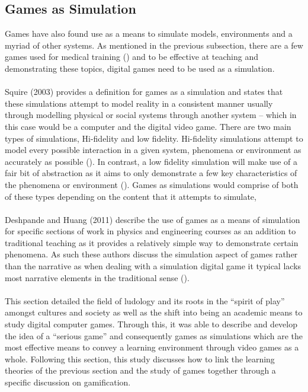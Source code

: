 \subsection{Games as Simulation}
Games have also found use as a means to simulate models, environments and a myriad of other systems. As mentioned in the previous subsection, there are a few games used for medical training (\cite{Burke2009}) and to be effective at teaching and demonstrating these topics, digital games need to be used as a simulation.
\\\\
Squire (2003) provides a definition for games as a simulation and states that these simulations attempt to model reality in a consistent manner usually through modelling physical or social systems through another system – which in this case would be a computer and the digital video game. There are two main types of simulations, Hi-fidelity and low fidelity. Hi-fidelity simulations attempt to model every possible interaction in a given system, phenomena or environment as accurately as possible (\cite{Squire2003}). In contrast, a low fidelity simulation will make use of a fair bit of abstraction as it aims to only demonstrate a few key characteristics of the phenomena or environment (\cite{Squire2003}). Games as simulations would comprise of both of these types depending on the content that it attempts to simulate,
\\\\
Deshpande and Huang (2011) describe the use of games as a means of simulation for specific sections of work in physics and engineering courses as an addition to traditional teaching as it provides a relatively simple way to demonstrate certain phenomena. As such these authors discuss the simulation aspect of games rather than the narrative as when dealing with a simulation digital game it typical lacks most narrative elements in the traditional sense (\cite{Deshpande2011}).
\\\\
This section detailed the field of ludology and its roots in the “spirit of play” amongst cultures and society as well as the shift into being an academic means to study digital computer games. Through this, it was able to describe and develop the idea of a “serious game” and consequently games as simulations which are the most effective means to convey a learning environment through video games as a whole. Following this section, this study discusses how to link the learning theories of the previous section and the study of games together through a specific discussion on gamification. 

